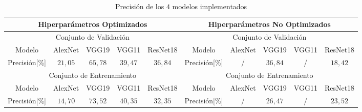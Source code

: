 \begin{table}[ht]
	\centering
	\resizebox{16cm}{!} {
		\begin{tabular}{|ccccc|ccccc|}
			\hline
			\multicolumn{5}{|c|}{Hiperparámetros Optimizados}                                                                                   & \multicolumn{5}{c|}{Hiperparámetros No Optimizados}                                                                                \\ \hline
			\multicolumn{5}{|c|}{Conjunto de Validación}                                                                                        & \multicolumn{5}{c|}{Conjunto de Validación}                                                                                        \\ \hline
			\multicolumn{1}{|c|}{Modelo}    & \multicolumn{1}{c|}{AlexNet} & \multicolumn{1}{c|}{VGG19} & \multicolumn{1}{c|}{VGG11} & ResNet18 & \multicolumn{1}{c|}{Modelo}    & \multicolumn{1}{c|}{AlexNet} & \multicolumn{1}{c|}{VGG19} & \multicolumn{1}{c|}{VGG11} & ResNet18 \\ \hline
			\multicolumn{1}{|c|}{Precisión[\%]} & \multicolumn{1}{c|}{$21,05$}   & \multicolumn{1}{c|}{$65,78$} & \multicolumn{1}{c|}{$39,47$} & $36,84$    & \multicolumn{1}{c|}{Precisión[\%]} & \multicolumn{1}{c|}{/}       & \multicolumn{1}{c|}{$36,84$} & \multicolumn{1}{c|}{/}     & $18,42$    \\ \hline
			\multicolumn{5}{|c|}{Conjunto de Entrenamiento}                                                                                     & \multicolumn{5}{c|}{Conjunto de Entrenamiento}                                                                                     \\ \hline
			\multicolumn{1}{|c|}{Modelo}    & \multicolumn{1}{c|}{AlexNet} & \multicolumn{1}{c|}{VGG19} & \multicolumn{1}{c|}{VGG11} & ResNet18 & \multicolumn{1}{c|}{Modelo}    & \multicolumn{1}{c|}{AlexNet} & \multicolumn{1}{c|}{VGG19} & \multicolumn{1}{c|}{VGG11} & ResNet18 \\ \hline
			\multicolumn{1}{|c|}{Precisión[\%]} & \multicolumn{1}{c|}{$14,70$}    & \multicolumn{1}{c|}{$73,52$} & \multicolumn{1}{c|}{$40,35$} & $32,35$    & \multicolumn{1}{c|}{Precisión[\%]} & \multicolumn{1}{c|}{/}       & \multicolumn{1}{c|}{$26,47$} & \multicolumn{1}{c|}{/}     & $23,52$    \\ \hline
		\end{tabular}
	}
	\caption{Precisión de los $4$ modelos implementados}
	\label{table:compacon}
\end{table}

